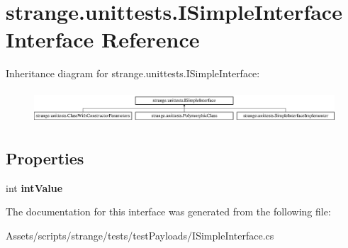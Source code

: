 \hypertarget{interfacestrange_1_1unittests_1_1_i_simple_interface}{\section{strange.\-unittests.\-I\-Simple\-Interface Interface Reference}
\label{interfacestrange_1_1unittests_1_1_i_simple_interface}
}
Inheritance diagram for strange.\-unittests.\-I\-Simple\-Interface\-:\begin{figure}[H]
\begin{center}
\leavevmode
\includegraphics[height=1.244444cm]{interfacestrange_1_1unittests_1_1_i_simple_interface}
\end{center}
\end{figure}
\subsection*{Properties}
\begin{DoxyCompactItemize}
\item 
\hypertarget{interfacestrange_1_1unittests_1_1_i_simple_interface_a13692d0866743ea50056c533ba6fa169}{int {\bfseries int\-Value}}\label{interfacestrange_1_1unittests_1_1_i_simple_interface_a13692d0866743ea50056c533ba6fa169}

\end{DoxyCompactItemize}


The documentation for this interface was generated from the following file\-:\begin{DoxyCompactItemize}
\item 
Assets/scripts/strange/tests/test\-Payloads/I\-Simple\-Interface.\-cs\end{DoxyCompactItemize}
